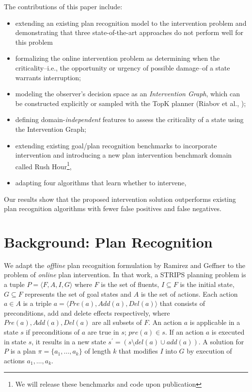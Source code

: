 \documentclass[letterpaper]{article}
\theoremstyle{plain}
\begin{document}
The contributions of this paper include:
\begin{itemize}
\item extending an existing plan recognition model to the intervention problem and demonstrating that three state-of-the-art approaches do not perform well for this problem
\item formalizing the online intervention problem as determining when the criticality--i.e., the opportunity or urgency of possible damage--of a state warrants interruption; 
\item modeling the observer's decision space as an \emph{Intervention Graph}, which can be constructed explicitly or sampled with the TopK planner (Riabov et al., \citeyear{riabov2014});
\item defining domain-\emph{independent} features to assess the criticality of a state using the Intervention Graph;
\item extending existing goal/plan recognition benchmarks \cite{ramirez2009plan,ramirez2010probabilistic} to incorporate intervention and introducing a new plan intervention benchmark domain called Rush Hour\footnote{We will release these benchmarks and code upon publication}, 
\item adapting four algorithms that learn whether to intervene, 
\end{itemize}
Our results show that the proposed intervention solution  outperforms existing plan recognition algorithms with fewer false positives and false negatives.

\section{Background: Plan Recognition}
\label{sec:prp}
We adapt the \emph{offline} plan recognition formulation by Ramirez and Geffner  to the problem of \emph{online} plan intervention.
In that work, a STRIPS \cite{fikes1971strips} planning problem is a tuple $ P = \langle F, A, I, G \rangle$ where $F$ is the set of fluents, $I\subseteq F$ is the initial state, $G  \subseteq F$ represents the set of goal states and $A$ is the set of actions. 
Each action $a \in A$ is a triple $a=\langle Pre(a), Add(a), Del(a)\rangle$ that consists of preconditions, add and delete effects respectively, where $Pre(a), Add(a), Del(a)$ are all subsets of $F$. 
An action $a$ is applicable in a state $s$ if preconditions of $a$ are true in $s$; $pre(a) \in s$. 
If an action $a$ is executed in state $s$, it results in a new state $s^{\prime} = (s \setminus del(a) \cup add(a))$.  
A solution for $P$ is a plan $\pi = \{a_1, \dots ,a_k\}$ of length $k$ that modifies $I$ into $G$ by execution of actions $a_1, \dots ,a_k$.
\end{document}
